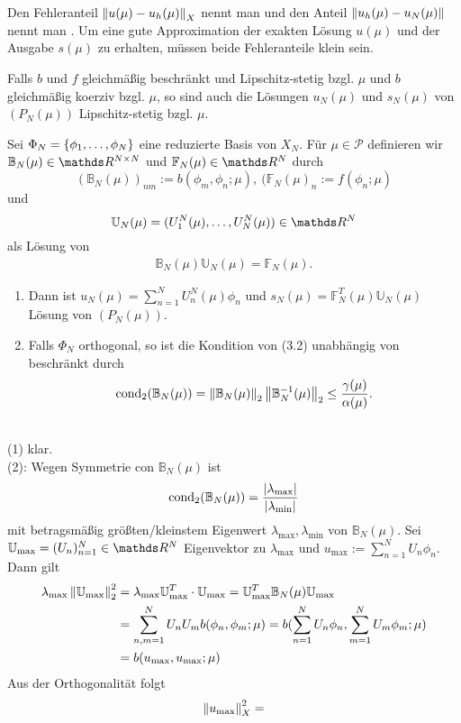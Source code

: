 Den Fehleranteil $\left\Vert u(\mu)-u_h(\mu)\right\Vert_X$ nennt man  und den Anteil $\left\Vert u_h(\mu)-u_N(\mu)\right\Vert$ nennt man .
Um eine gute Approximation der exakten Lösung $u(\mu)$ und der Ausgabe $s(\mu)$ zu erhalten, müssen beide Fehleranteile klein sein.

Falls $b$ und $f$ gleichmäßig beschränkt und Lipschitz-stetig bzgl. $\mu$ und $b$ gleichmäßig koerziv bzgl. $\mu$, so sind auch die Lösungen $u_N(\mu)$ und $s_N(\mu)$ von $(P_N(\mu))$ Lipschitz-stetig bzgl. $\mu$.

Sei $\Phi_N = \left\{\phi_1, \dots ,\phi_N\right\}$ eine reduzierte Basis von $X_N$.
Für $\mu\in\mathcal{P}$ definieren wir $\mathbb{B}_N(\mu) \in\R^{N\times N}$ und $\mathbb{F}_N(\mu)\in \R^N$ durch 
\[
(\mathbb{B}_N(\mu))_{nm} := b(\phi_m,\phi_n;\mu),~ (\mathbb{F}_N(\mu)_n := f(\phi_n;\mu)
\]
und
\[
\mathbb{U}_N(\mu) = (U_1^N(\mu)\dt{,}U_N^N(\mu))\in \R^N
\]
als Lösung von 
\begin{align}
\mathbb{B}_N(\mu)\mathbb{U}_N(\mu) = \mathbb{F}_N(\mu).
\end{align}
\begin{enumerate}[(1)]
	\item Dann ist $u_N(\mu)= \sum_{n=1}^{N} U_n^N(\mu)\phi_n$ und $s_N(\mu) = \mathbb{F}_N^T(\mu)\mathbb{U}_N(\mu)$ Lösung von $(P_N(\mu))$.
	\item Falls $\Phi_N$ orthogonal, so ist die Kondition von (3.2) unabhängig von beschränkt durch
	\[
	\operatorname{cond}_2(\mathbb{B}_N(\mu)) = \left\Vert\mathbb{B}_N(\mu)\right\Vert_2 \left\Vert\mathbb{B}_N^{-1}(\mu)\right\Vert_2\le \frac{\gamma(\mu)}{\alpha(\mu)}.
	\]
\end{enumerate}

\\
(1) klar.\\
(2): Wegen Symmetrie con $\mathbb{B}_N(\mu)$ ist 
\begin{align}
\operatorname{cond}_2(\mathbb{B}_N(\mu)) = \frac{\left\vert\lambda_{\max}\right\vert}{\left\vert\lambda_{\min}\right\vert}
\end{align}
mit betragsmäßig größten/kleinstem Eigenwert $\lambda_{\max},\lambda_{\min}$ von $\mathbb{B}_N(\mu)$.
Sei $\mathbb{U}_{\max} = (U_n)_{n=1}^N\in \R^N$ Eigenvektor zu $\lambda_{\max}$ und $u_{\max} := \sum_{n=1}^{N} U_n\phi_n$.
Dann gilt
\begin{align*}
\lambda_{\max} \left\Vert\mathbb{U}_{\max}\right\Vert_2^2 &= \lambda_{\max} \mathbb{U}_{\max}^T\cdot\mathbb{U}_{\max} = \mathbb{U}_{\max}^T \mathbb{B}_N(\mu) \mathbb{U}_{\max}\\
&= \sum_{n,m=1}^N U_nU_m b(\phi_n,\phi_m;\mu) = b(\sum_{n=1}^{N} U_n\phi_n,\sum_{m=1}^{N} U_m\phi_m;\mu) \\
&= b(u_{\max},u_{\max};\mu)
\end{align*}
Aus der Orthogonalität folgt
\[
\left\Vert u_{\max}\right\Vert_X^2 = 
\]

